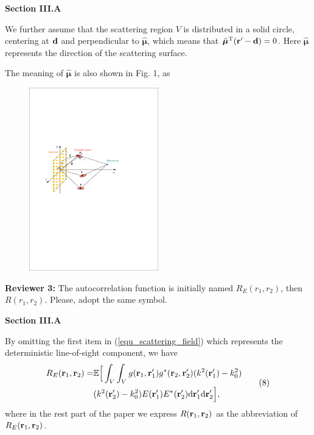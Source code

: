 \documentclass[a4paper,12pt]{article}
\begin{document}
\begin{framed}
	{\bf{Section III.A}}

	\quad We further assume that the scattering region $V$ is distributed in a solid circle, centering at ${\bf d}$ and perpendicular to $\hat{\boldsymbol{\mu}}$, which means that $\hat{\boldsymbol{\mu}}^{\rm T}({\bf r}'-{\bf d})=0 $. {\color{red}Here $\hat{\boldsymbol{\mu}}$ represents the direction of the scattering surface.}
\end{framed}

{\color{blue}
The meaning of $\boldsymbol{\hat{\mu}}$ is also shown in Fig. 1, as 
\begin{figure}[H]
	\centering 
	\includegraphics[width=0.5\textwidth]{figs/threedimension_solid_circle.pdf} 
	\label{fig_3d_solid_sphere}
\end{figure}
}

\textbf{Reviewer 3:}
The autocorrelation function is initially named $R_E(r_1,r_2)$, then $R(r_1,r_2)$. Please, adopt the same symbol.

{}

\begin{framed}
	{\bf{Section III.A}}

	\quad By omitting the first item in (\ref{equ_scattering_field}) which represents the deterministic line-of-sight component, we have 
\begin{equation}
	\begin{aligned}
	R_E({\bf r}_1,{\bf r}_2) =& \mathbb{E} \Big[\int_V\int_V g({\bf r}_1,{\bf r}_1')g^{*}({\bf r}_2,{\bf r}_2')(k^2({\bf r}'_1)-k_0^2)
	\\& (k^2({\bf r}'_2)-k_0^2) E({\bf r}_1') E^{*}({\bf r}_2') {\rm d}{\bf r}_1'{\rm d}{\bf r}_2'\Big],
	\end{aligned}
	\tag{8}
	\label{equ_correlation_complicated}
\end{equation}
{\color{red}where in the rest part of the paper we express $R({\bf r}_1,{\bf r}_2)$ as the abbreviation of $R_E({\bf r}_1,{\bf r}_2)$.}
\end{framed}
\end{document}
